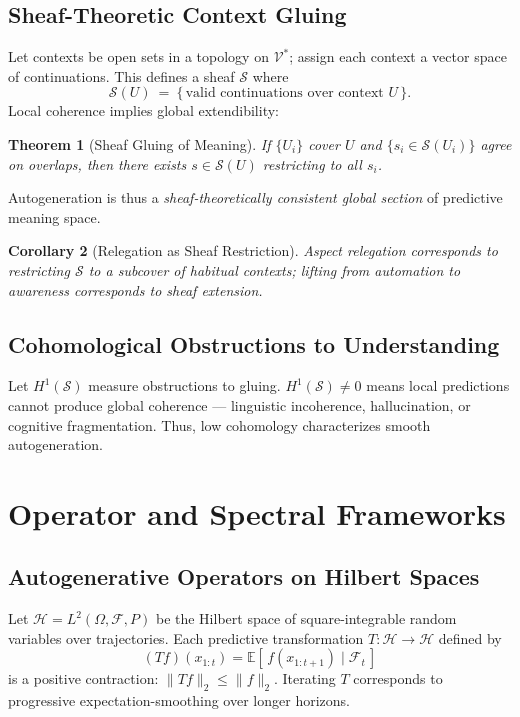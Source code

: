 \documentclass[12pt,a4paper,twoside,openright]{book}
\newtheorem{theorem}{Theorem}
\newtheorem{corollary}[theorem]{Corollary}
\begin{document}
\subsection{Sheaf-Theoretic Context Gluing}
Let contexts be open sets in a topology on $\mathcal{V}^\ast$; assign each context a vector space of continuations.
This defines a sheaf $\mathcal{S}$ where
\[
\mathcal{S}(U) \ =\ \{\,\text{valid continuations over context }U\,\}.
\]
Local coherence implies global extendibility:
\begin{theorem}[Sheaf Gluing of Meaning]
If $\{U_i\}$ cover $U$ and $\{s_i\in\mathcal{S}(U_i)\}$ agree on overlaps, then there exists $s\in\mathcal{S}(U)$ restricting to all $s_i$.
\end{theorem}
Autogeneration is thus a \emph{sheaf-theoretically consistent global section} of predictive meaning space.

\begin{corollary}[Relegation as Sheaf Restriction]
Aspect relegation corresponds to restricting $\mathcal{S}$ to a subcover of habitual contexts; lifting from automation to awareness corresponds to sheaf extension.
\end{corollary}

\subsection{Cohomological Obstructions to Understanding}
Let $H^1(\mathcal{S})$ measure obstructions to gluing.
$H^1(\mathcal{S})\neq 0$ means local predictions cannot produce global coherence — linguistic incoherence, hallucination, or cognitive fragmentation.
Thus, low cohomology characterizes smooth autogeneration.

\section{Operator and Spectral Frameworks}
\subsection{Autogenerative Operators on Hilbert Spaces}
Let $\mathcal{H}=L^2(\Omega,\mathcal{F},P)$ be the Hilbert space of square-integrable random variables over trajectories.
Each predictive transformation $T:\mathcal{H}\to\mathcal{H}$ defined by
\[
(Tf)(x_{1:t})=\mathbb{E}[\,f(x_{1:t+1})\mid \mathcal{F}_t\,]
\]
is a positive contraction: $\|Tf\|_2\le \|f\|_2$.
Iterating $T$ corresponds to progressive expectation-smoothing over longer horizons.
\end{document}
